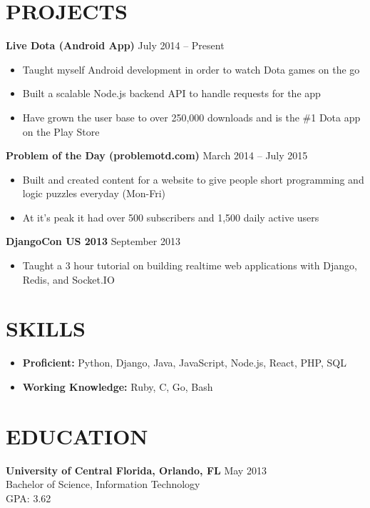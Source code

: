 \documentclass[margin]{res}
\begin{document}
\begin{resume}
\section{PROJECTS}
\textbf{Live Dota (Android App)} \hfill July 2014 -- Present
\begin{itemize}[leftmargin=10pt]
\itemsep -1pt %
\item Taught myself Android development in order to watch Dota games on the go
\item Built a scalable Node.js backend API to handle requests for the app
\item Have grown the user base to over 250,000 downloads and is the \#1 Dota app on the Play Store
\end{itemize}

\textbf{Problem of the Day (problemotd.com)} \hfill March 2014 -- July 2015
\begin{itemize}[leftmargin=10pt]
\itemsep -1pt %
\item Built and created content for a website to give people short programming and logic puzzles everyday (Mon-Fri)
\item At it's peak it had over 500 subscribers and 1,500 daily active users
\end{itemize}

\textbf{DjangoCon US 2013} \hfill September 2013
\begin{itemize}[leftmargin=10pt]
\itemsep -1pt %
\item Taught a 3 hour tutorial on building realtime web applications with Django, Redis, and Socket.IO
\end{itemize}

\section{SKILLS}
\begin{itemize}[leftmargin=0pt]
\itemsep -1pt %
\item[] \textbf{Proficient:} Python, Django, Java, JavaScript, Node.js, React, PHP, SQL
\item[] \textbf{Working Knowledge:} Ruby, C, Go, Bash
\end{itemize}

\section{EDUCATION} 
\textbf{University of Central Florida, Orlando, FL}
\hfill May 2013 \\
Bachelor of Science, Information Technology \\
GPA: 3.62 

\end{resume}
\end{document}
